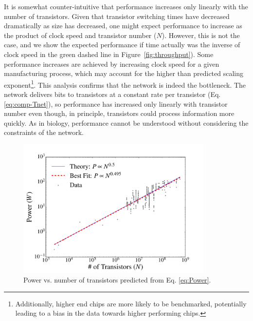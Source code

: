 \documentclass[12pt]{article}
\begin{document}
It is somewhat counter-intuitive that
performance increases only linearly with the number of transistors.
Given that transistor switching times have decreased
dramatically as size has decreased, one might expect performance to increase as
the product of clock speed and transistor number ($N$).  However, this
is not the case, and we show
the expected performance if time actually was the inverse of clock
speed in the green dashed line in Figure~\ref{fig:throughput}). Some performance
increases are achieved by increasing clock speed for a given manufacturing
process, which may account for the higher than predicted scaling
exponent\footnote{Additionally, higher end chips are more likely to be
benchmarked, potentially leading to a bias in the data towards higher
performing chips.}. This analysis confirms that the network is indeed the
bottleneck. The network delivers bits to transistors at a constant rate per
transistor (Eq. \ref{eq:comp-Tnet}), so performance has increased only linearly
with transistor number even though, in principle, transistors could process
information more quickly.  As in biology, performance cannot be understood
without considering the constraints of the network.


\begin{figure}[!h]
\centering
\includegraphics[height=70mm]{Figures/ChipsPowerScaling.pdf}
\caption{Power vs. number of transistors predicted from
  Eq. \ref{eq:Power}.}
\label{fig:power}
\end{figure}
\end{document}
